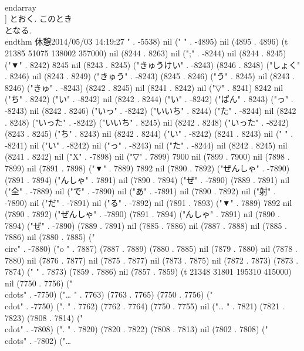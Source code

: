 {  \\end{array}
 \\]
 とおく. このとき
 \\[
  \\G(\\F(H))=H, \\F(\\G(K))=K
 \\]
 となる. 
\\end{thm}
休憩2014/05/03 14:19:27
" . -5538) nil ("
" . -4895) nil (4895 . 4896) (t 21385 51075 138002 357000) nil (8244 . 8263) nil (";" . -8244) nil (8244 . 8245) ("▼" . 8242) 8245 nil (8243 . 8245) ("きゅうけい" . -8243) (8246 . 8248) ("しょく" . 8246) nil (8243 . 8249) ("きゅう" . -8243) (8245 . 8246) ("う" . 8245) nil (8243 . 8246) ("きゅ" . -8243) (8242 . 8245) nil (8241 . 8242) nil ("▽" . 8241) 8242 nil ("ち" . 8242) ("い" . -8242) nil (8242 . 8244) ("い" . -8242) ("ぱん" . 8243) ("っ" . -8243) nil (8242 . 8246) ("いっ" . -8242) ("いいち" . 8244) ("た" . -8244) nil (8242 . 8248) ("いった" . -8242) ("いいち" . 8245) nil (8242 . 8248) ("いった" . -8242) (8243 . 8245) ("ち" . 8243) nil (8242 . 8244) ("い" . -8242) (8241 . 8243) nil ("
" . -8241) nil ("い" . -8242) nil ("っ" . -8243) nil ("た" . -8244) nil (8242 . 8245) nil (8241 . 8242) nil ("X" . -7898) nil ("▽" . 7899) 7900 nil (7899 . 7900) nil (7898 . 7899) nil (7891 . 7898) ("▼" . 7889) 7892 nil (7890 . 7892) ("ぜんしゃ" . -7890) (7891 . 7894) ("んしゃ" . 7891) nil (7890 . 7894) ("ぜ" . -7890) (7889 . 7891) nil ("全" . -7889) nil ("で" . -7890) nil ("あ" . -7891) nil (7890 . 7892) nil ("射" . -7890) nil ("だ" . -7891) nil ("る" . -7892) nil (7891 . 7893) ("▼" . 7889) 7892 nil (7890 . 7892) ("ぜんしゃ" . -7890) (7891 . 7894) ("んしゃ" . 7891) nil (7890 . 7894) ("ぜ" . -7890) (7889 . 7891) nil (7885 . 7886) nil (7887 . 7888) nil (7885 . 7886) nil (7880 . 7885) ("\\circ" . -7880) ("o
" . 7887) (7887 . 7889) (7880 . 7885) nil (7879 . 7880) nil (7878 . 7880) nil (7876 . 7877) nil (7875 . 7877) nil (7873 . 7875) nil (7872 . 7873) (7873 . 7874) ("  " . 7873) (7859 . 7886) nil (7857 . 7859) (t 21348 31801 195310 415000) nil (7750 . 7756) ("\\cdots" . -7750) ("…
" . 7763) (7763 . 7765) (7750 . 7756) ("\\cdot" . -7750) (".
" . 7762) (7762 . 7764) (7750 . 7755) nil ("…
" . 7821) (7821 . 7823) (7808 . 7814) ("\\cdot" . -7808) (".
" . 7820) (7820 . 7822) (7808 . 7813) nil (7802 . 7808) ("\\cdots" . -7802) ("…
}
